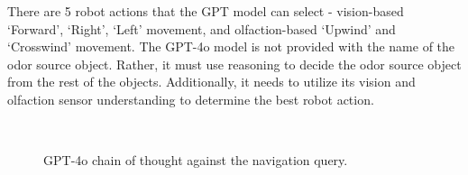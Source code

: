 There are 5 robot actions that the GPT model can select - vision-based `Forward', `Right', `Left' movement, and olfaction-based `Upwind' and `Crosswind' movement. The GPT-4o model is not provided with the name of the odor source object. Rather, it must use reasoning to decide the odor source object from the rest of the objects. Additionally, it needs to utilize its vision and olfaction sensor understanding to determine the best robot action.

\begin{figure}[h!] %
\ \\
\vspace*{-.18in}
\begin{center}
\end{center}
\vspace{-.1in}

\caption
{GPT-4o chain of thought against the navigation query.}
\label{fig:LLMAnswers}
\end{figure}

